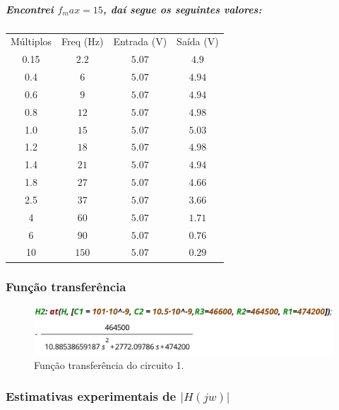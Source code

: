 \documentclass[12pt,twoside, a4paper, twocolumn]{article}
\begin{document}
\subparagraph*{Encontrei $f_max = 15$, daí segue os seguintes valores:}


\begin{center}
    \begin{tabular}{ |c|c|c|c| }
        \hline
        Múltiplos & Freq (Hz) & Entrada (V) & Saída (V) \\
        0.15      & $2.2$     & $5.07$      & $4.9$     \\
        0.4       & $6$       & $5.07$      & $4.94$    \\
        0.6       & $9$       & $5.07$      & $4.94$    \\
        0.8       & $12$      & $5.07$      & $4.98$    \\
        1.0       & $15$      & $5.07$      & $5.03$    \\
        1.2       & $18$      & $5.07$      & $4.98$    \\
        1.4       & $21$      & $5.07$      & $4.94$    \\
        1.8       & $27$      & $5.07$      & $4.66$    \\
        2.5       & $37$      & $5.07$      & $3.66$    \\
        4         & $60$      & $5.07$      & $1.71$    \\
        6         & $90$      & $5.07$      & $0.76$    \\
        10        & $150$     & $5.07$      & $0.29$    \\
        \hline
    \end{tabular}
\end{center}


\subsubsection{Função transferência}


\begin{figure}[h]
    \centering
    \includegraphics[width=1\columnwidth]{images/H2valoresreais.png}
    \caption{Função transferência do circuito 1.}
\end{figure}


\subsubsection{Estimativas experimentais de $ | H(jw) | $}
\end{document}
